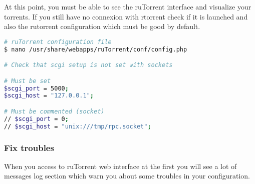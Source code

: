 At this point, you must be able to see the ruTorrent interface and visualize your 
torrents. If you still have no connexion with rtorrent check if it is launched and 
also the rutorrent configuration which must be good by default.

\begin{lstlisting}[language=bash,caption=Check ruTorrent configuration]
# ruTorrent configuration file
$ nano /usr/share/webapps/ruTorrent/conf/config.php

# Check that scgi setup is not set with sockets

# Must be set
$scgi_port = 5000;
$scgi_host = "127.0.0.1";

# Must be commented (socket)
// $scgi_port = 0;
// $scgi_host = "unix:///tmp/rpc.socket";
\end{lstlisting}

\subsubsection{Fix troubles}
When you access to ruTorrent web interface at the first you will see a lot of 
messages log section which warn you about some troubles in your configuration.

